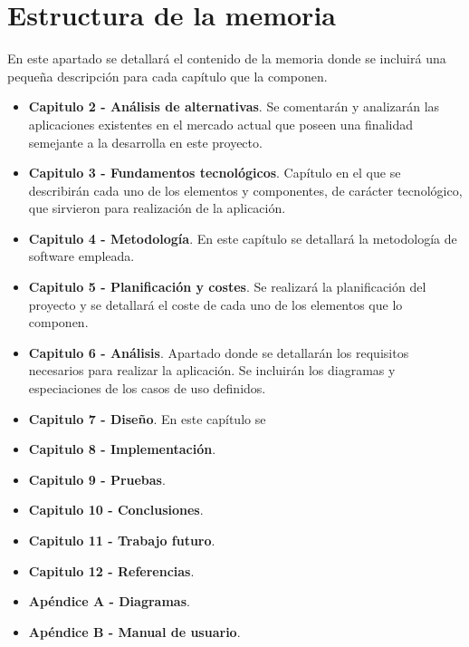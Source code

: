 \section{Estructura de la memoria}
En este apartado se detallará el contenido de la memoria donde se incluirá una pequeña descripción para cada capítulo que la componen.

\begin{itemize}
	\item \textbf{Capitulo 2 - Análisis de alternativas}. Se comentarán y analizarán las aplicaciones existentes en el mercado actual que poseen una finalidad semejante a la desarrolla en este proyecto.  
	\item \textbf{Capitulo 3 - Fundamentos tecnológicos}. Capítulo en el que se describirán cada uno de los elementos y componentes, de carácter tecnológico, que sirvieron para realización de la aplicación.
	\item \textbf{Capitulo 4 - Metodología}. En este capítulo se detallará la metodología de software empleada.
	\item \textbf{Capitulo 5 - Planificación y costes}. Se realizará la planificación del proyecto y se detallará el coste de cada uno de los elementos que lo componen.
	\item \textbf{Capitulo 6 - Análisis}. Apartado donde se detallarán los requisitos necesarios para realizar la aplicación. Se incluirán los diagramas y especiaciones de los casos de uso definidos.
	\item \textbf{Capitulo 7 - Diseño}. En este capítulo se 
	\item \textbf{Capitulo 8 - Implementación}. 
	\item \textbf{Capitulo 9 - Pruebas}. 
	\item \textbf{Capitulo 10 - Conclusiones}. 
	\item \textbf{Capitulo 11 - Trabajo futuro}. 
	\item \textbf{Capitulo 12 - Referencias}. 
	\item \textbf{Apéndice A - Diagramas}.
	\item \textbf{Apéndice B - Manual de usuario}.  
\end{itemize}

















